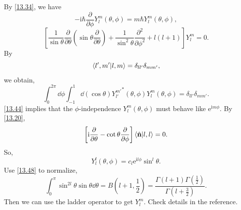 \documentclass{article}
\theoremstyle{1}
\newcommand{\pa}{\partial}
\newcommand{\ii}{\mathrm{i}}
\newcommand{\ee}{\mathrm{e}}
\begin{document}
By \eqref{13.34}, we have 
\begin{equation}\label{13.44}
    -\ii \hbar \frac{\pa}{\pa \phi}Y_l^m\left(\theta,\phi\right)=m\hbar Y_l^m\left(\theta,\phi\right),
\end{equation}
\begin{equation}
    \left[\frac{1}{\sin \theta}\frac{\pa}{\pa \theta}\left(\sin\theta\frac{\pa}{\pa \theta}\right)+\frac{1}{\sin^2\theta}\frac{\pa^2}{\pa \phi^2}+l\left(l+1\right)\right]Y_l^m=0.
\end{equation}
By 
\begin{equation}
    \bra{l',m'}\ket{l,m}=\delta_{ll'}\delta_{mm'},
\end{equation}
we obtain,
\begin{equation}\label{13.48}
    \int_{0}^{2\pi}\dd{\phi}\int_{-1}^{1}\dd{(\cos\theta)}{Y_{l'}^{m'}}^*\left(\theta,\phi\right)Y^m_l\left(\theta,\phi\right)=\delta_{ll'}\delta_{mm'}.
\end{equation}
\eqref{13.44} implies that the $\phi$-independence $Y_l^m\left(\theta,\phi\right)$ must behave like $\ee^{\ii m \phi}$. By \eqref{13.20},
\begin{equation}
    \left[\ii \frac{\pa }{\pa \theta}-\cot\theta\frac{\pa}{\pa \phi}\right]\braket{\hat{\mathbf{n}}}{l,l}=0.
\end{equation}
So, 
\begin{equation}
    Y_l^l\left(\theta,\phi\right)=c_l\ee^{\ii l\phi}\sin^l\theta.
\end{equation}
Use \eqref{13.48} to normalize,
\begin{equation}
    \int_{0}^{\pi}\sin^{2l}\theta \sin\theta \dd{\theta}=B\left(l+1,\frac{1}{2}\right)=\frac{\Gamma\left(l+1\right)\Gamma\left(\frac{1}{2}\right)}{\Gamma\left(l+\frac{3}{2}\right)}.
\end{equation}
Then we can use the ladder operator to get $Y_l^m$. Check details in the reference.
\end{document}
